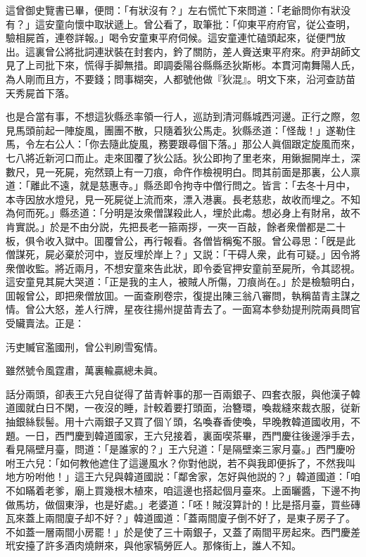 這曾御史覽書已畢，便問：「有狀沒有？」左右慌忙下來問道：「老爺問你有狀没有？」這安童向懷中取狀遞上。曾公看了，取筆批：「仰東平府府官，従公查明，驗相屍首，連卷詳報。」喝令安童東平府伺候。這安童連忙磕頭起來，従便門放出。這裏曾公將批詞連狀裝在封套内，鈐了關防，差人賫送東平府來。府尹胡師文見了上司批下來，慌得手脚無措。即調委陽谷縣縣丞狄斯彬。本貫河南舞陽人氏，為人剛而且方，不要錢；問事糊突，人都號他做『狄混』。明文下來，沿河查訪苗天秀屍首下落。

也是合當有事，不想這狄縣丞率領一行人，巡訪到清河縣城西河邊。正行之際，忽見馬頭前起一陣旋風，團團不散，只隨着狄公馬走。狄縣丞道：「怪哉！」遂勒住馬，令左右公人：「你去隨此旋風，務要跟尋個下落。」那公人眞個跟定旋風而來，七八將近新河口而止。走來囬覆了狄公話。狄公即拘了里老來，用鍬掘開岸土，深數尺，見一死屍，宛然頸上有一刀痕，命仵作檢視明白。問其前面是那裏，公人禀道：「離此不遠，就是慈惠寺。」縣丞即令拘寺中僧行問之。皆言：「去冬十月中，本寺因放水燈兒，見一死屍従上流而來，漂入港裏。長老慈悲，故收而埋之。不知為何而死。」縣丞道：「分明是汝衆僧謀殺此人，埋於此䖏。想必身上有財帛，故不肯實説。」於是不由分説，先把長老一箍兩拶，一夾一百敲，餘者衆僧都是二十板，俱令收入獄中。囬覆曾公，再行報看。各僧皆稱寃不服。曾公尋思：「旣是此僧謀死，屍必棄於河中，豈反埋於岸上？」又説：「干碍人衆，此有可疑。」因令將衆僧收監。將近兩月，不想安童來告此狀，即令委官押安童前至屍所，令其認視。這安童見其屍大哭道：「正是我的主人，被賊人所傷，刀痕尚在。」於是檢驗明白，囬報曾公，即把衆僧放囬。一面查刷卷宗，復提出陳三翁八審問，執稱苗青主謀之情。曾公大怒，差人行牌，星夜往揚州提苗青去了。一面寫本參劾提刑院兩員問官受贜賣法。正是：

\begin{myquote}
汚吏贓官濫國刑，曾公判刷雪寃情。

雖然號令風霆肅，萬裏輸贏總未眞。
\end{myquote}

話分兩頭，卻表王六兒自従得了苗青幹事的那一百兩銀子、四套衣服，與他漢子韓道國就白日不閑，一夜沒的睡，計較着要打頭面，治簪環，喚裁縫來裁衣服，従新抽銀絲䯼髻。用十六兩銀子又買了個丫頭，名喚春香使喚，早晚教韓道國收用，不題。一日，西門慶到韓道國家，王六兒接着，裏面喫茶畢，西門慶往後邊淨手去，看見隔壁月臺，問道：「是誰家的？」王六兒道：「是隔壁楽三家月臺。」西門慶吩咐王六兒：「如何教他遮住了這邊風水？你對他説，若不與我即便拆了，不然我叫地方吩咐他！」這王六兒與韓道國説：「鄰舍家，怎好與他説的？」韓道國道：「咱不如瞞着老爹，廟上買幾根木植來，咱這邊也搭起個月臺來。上面曬醬，下邊不拘做馬坊，做個東淨，也是好處。」老婆道：「呸！賊沒算計的！比是搭月臺，買些磚瓦來蓋上兩間廈子却不好？」韓道國道：「蓋兩間廈子倒不好了，是東子房子了。不如蓋一層兩間小房罷！」於是使了三十兩銀子，又蓋了兩間平房起來。西門慶差玳安擡了許多酒肉燒餅來，與他家犒勞匠人。那條街上，誰人不知。

